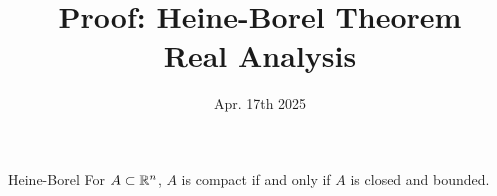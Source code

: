 \documentclass[12pt, letterpaper]{article}
\title{Proof: Heine-Borel Theorem\\
Real Analysis}
\date{Apr. 17th 2025}
\begin{document}
\maketitle
\begin{thm}{Heine-Borel}
For $A\subset {\mathbb{R}}^n$, $A$ is compact if and only if $A$ is closed and bounded. 
\end{thm}


\begin{prf*}
	
\end{prf*}
\end{document}

